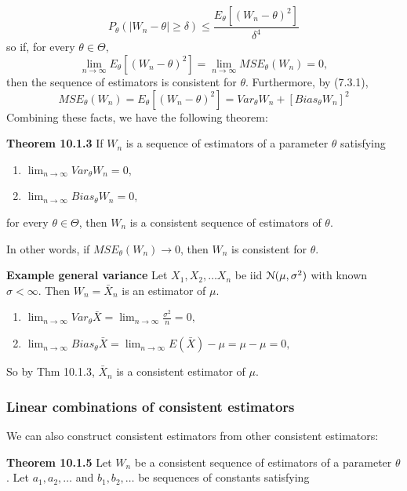 \documentclass[11pt,]{article}
\def\Xbar{\bar{ X}}
\def\Nsc{{\cal N}}
\begin{document}
\[P_\theta(|W_n - \theta| \geq \delta) \leq \frac{E_\theta[(W_n - \theta)^2]}{\delta^4}\]
so if, for every \(\theta \in \Theta,\)
\[\lim_{n\to\infty} E_\theta [(W_n - \theta)^2] =\lim_{n\to\infty} MSE_\theta(W_n) = 0,\]
then the sequence of estimators is consistent for \(\theta\).
Furthermore, by (7.3.1),
\[MSE_\theta(W_n) = E_\theta[ (W_n - \theta)^2] = Var_\theta W_n + [Bias_\theta W_n]^2\]
Combining these facts, we have the following theorem:

\noindent\textbf{Theorem 10.1.3} If \(W_n\) is a sequence of estimators
of a parameter \(\theta\) satisfying

\begin{enumerate}
\item $\lim_{n\to\infty} Var_\theta W_n = 0,$
\item $\lim_{n\to\infty} Bias_\theta W_n = 0,$
\end{enumerate}

for every \(\theta \in \Theta\), then \(W_n\) is a consistent sequence
of estimators of \(\theta\).

In other words, if \(MSE_\theta(W_n) \to 0\), then \(W_n\) is consistent
for \(\theta\).

\textbf{Example general variance} Let \(X_1, X_2, \ldots X_n\) be iid
\(\Nsc(\mu,\sigma^2)\) with known \(\sigma < \infty\). Then
\(W_n = \Xbar_n\) is an estimator of \(\mu\).

\begin{enumerate}
\item $\lim_{n\to\infty} Var_\theta \Xbar = \lim_{n\to\infty} \frac{\sigma^2}{n} = 0,$
\item $\lim_{n\to\infty} Bias_\theta \Xbar = \lim_{n\to\infty} E(\Xbar) - \mu = \mu - \mu = 0,$
\end{enumerate}

So by Thm 10.1.3, \(\Xbar_n\) is a consistent estimator of \(\mu\).

\hypertarget{linear-combinations-of-consistent-estimators}{%
\subsubsection{Linear combinations of consistent
estimators}\label{linear-combinations-of-consistent-estimators}}

We can also construct consistent estimators from other consistent
estimators:

\noindent\textbf{Theorem 10.1.5} Let \(W_n\) be a consistent sequence of
estimators of a parameter \(\theta\). Let \(a_1, a_2, \ldots\) and
\(b_1, b_2,\ldots\) be sequences of constants satisfying
\end{document}
